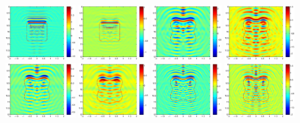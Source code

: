 \documentclass[12pt]{iopart}
\begin{document}
\begin{figure}
	\includegraphics[width=0.24\textwidth]{./graphic/rectangle_4pi_impedance_1.eps}
	\includegraphics[width=0.24\textwidth]{./graphic/rectangle_4pi_transmission.eps}
	\includegraphics[width=0.24\textwidth]{./graphic/p_leaf_2pi.eps}
	\includegraphics[width=0.24\textwidth]{./graphic/p_leaf_2pi_neumann.eps}
	\includegraphics[width=0.24\textwidth]{./graphic/p_leaf_2pi_impedance_1.eps}
	\includegraphics[width=0.24\textwidth]{./graphic/p_leaf_2pi_transmission.eps}
	\includegraphics[width=0.24\textwidth]{./graphic/p_leaf_3pi.eps}
	\includegraphics[width=0.24\textwidth]{./graphic/p_leaf_3pi_neumann.eps}

\end{figure}
\end{document}
